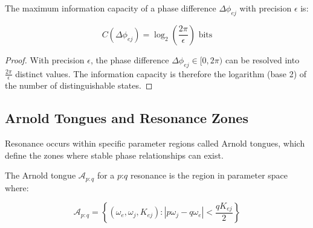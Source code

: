 \begin{theorem}
The maximum information capacity of a phase difference $\Delta\phi_{ej}$ with precision $\epsilon$ is:

\begin{equation}
C(\Delta\phi_{ej}) = \log_2\left(\frac{2\pi}{\epsilon}\right) \text{ bits}
\end{equation}
\end{theorem}

\begin{proof}
With precision $\epsilon$, the phase difference $\Delta\phi_{ej} \in [0, 2\pi)$ can be resolved into $\frac{2\pi}{\epsilon}$ distinct values. The information capacity is therefore the logarithm (base 2) of the number of distinguishable states.
\end{proof}

\subsection{Arnold Tongues and Resonance Zones}

Resonance occurs within specific parameter regions called Arnold tongues, which define the zones where stable phase relationships can exist.

\begin{definition}
The Arnold tongue $\mathcal{A}_{p:q}$ for a $p$:$q$ resonance is the region in parameter space where:

\begin{equation}
\mathcal{A}_{p:q} = \left\{(\omega_e, \omega_j, K_{ej}) : \left|p\omega_j - q\omega_e\right| < \frac{qK_{ej}}{2}\right\}
\end{equation}
\end{definition}

